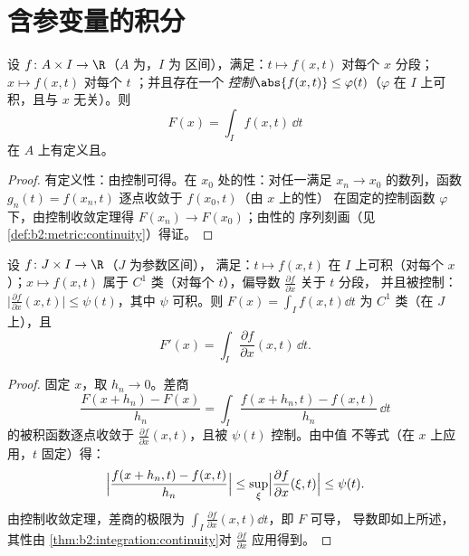 \section{含参变量的积分}

\begin{theorem}[积分号下的连续性]\label{thm:b2:integration:continuity}
设 $f \colon A \times I \to \R$（$A$ 为，$I$ 为
区间），满足：$t \mapsto f(x, t)$ 对每个
$x$ 分段；$x \mapsto f(x, t)$ 对每个 $t$ ；并且存在一个
\emph{控制}$\abs{f(x,t)} \leq \varphi(t)$（$\varphi$
在 $I$ 上可积，且与 $x$ 无关）。则
\[
F(x) = \int_I f(x, t)\,\dd t
\]
在 $A$ 上有定义且。
\end{theorem}

\begin{proof}
有定义性：由控制可得。在
$x_0$ 处的性：对任一满足 $x_n \to x_0$ 的数列，函数 $g_n(t) =
f(x_n, t)$ 逐点收敛于 $f(x_0, t)$（由 $x$ 上的性）
在固定的控制函数 $\varphi$ 下，由控制收敛定理得
$F(x_n) \to F(x_0)$；由性的
序列刻画（见\cref{def:b2:metric:continuity}）得证。
\end{proof}

\begin{theorem}[积分号下的求导]\label{thm:b2:integration:leibnizrule}
设 $f \colon J \times I \to \R$（$J$ 为参数区间），
满足：$t \mapsto f(x,t)$ 在 $I$ 上可积（对每个 $x$）；$x \mapsto
f(x,t)$ 属于 $C^1$ 类（对每个 $t$），偏导数
$\frac{\partial f}{\partial x}$ 关于 $t$ 分段，
并且被控制：$\bigl|\frac{\partial f}{\partial x}(x,t)\bigr| \leq
\psi(t)$，其中 $\psi$ 可积。则 $F(x) = \int_I f(x,t)\dd t$
为 $C^1$ 类（在 $J$ 上），且
\[
F'(x) = \int_I \frac{\partial f}{\partial x}(x, t)\,\dd t .
\]
\end{theorem}

\begin{proof}
固定 $x$，取 $h_n \to 0$。差商
\[
\frac{F(x + h_n) - F(x)}{h_n}
= \int_I \frac{f(x + h_n, t) - f(x, t)}{h_n}\,\dd t
\]
的被积函数逐点收敛于 $\frac{\partial f}{\partial
x}(x, t)$，且被 $\psi(t)$ 控制。由中值
不等式（在 $x$ 上应用，$t$ 固定）得：
\[
\Bigl|\frac{f(x + h_n, t) - f(x,t)}{h_n}\Bigr|
\leq \sup_{\xi} \Bigl|\frac{\partial f}{\partial x}(\xi, t)\Bigr|
\leq \psi(t) .
\]
由控制收敛定理，差商的极限为 $\int_I \frac{\partial
f}{\partial x}(x,t)\dd t$，即 $F$ 可导，
导数即如上所述，其性由
\cref{thm:b2:integration:continuity}对 $\frac{\partial
f}{\partial x}$ 应用得到。
\end{proof}

